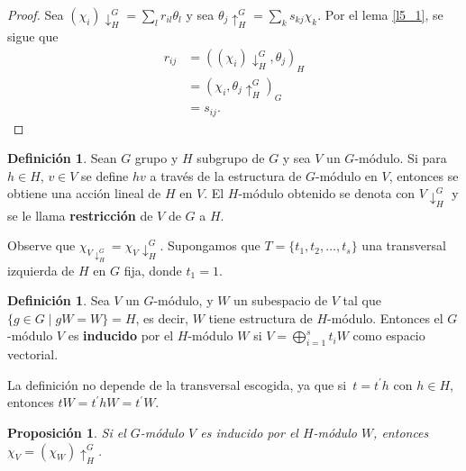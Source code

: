 \documentclass[12pt]{book}
\newtheorem{proposition}[theorem]{Proposición}
\theoremstyle{definition}
\newtheorem{definition}[theorem]{Definición}
\newcounter{in}
\newcounter{ini}
\begin{document}
\begin{proof}
  Sea $(\chi_{i})\downarrow^{G}_{H} = \sum_{l} r_{il} \theta_{l}$ y sea
  $\theta_{j}\uparrow^{G}_{H} = \sum_{k} s_{kj} \chi_{k}$. Por el lema \ref{l5_1}, se
  sigue que
  \begin{equation}
    \label{eq:66}
    \begin{aligned}
      r_{ij} &= ((\chi_{i})\downarrow^{G}_{H},\theta_{j})_{H} \\
      &= (\chi_{i},\theta_{j}\uparrow^{G}_{H})_{G}\\
      &= s_{ij}.
    \end{aligned}
  \end{equation}
\end{proof}
\begin{mdframed}
\begin{definition}
  Sean $G$ grupo y $H$ subgrupo de $G$ y sea $V$ un $G$-módulo. 
  Si para $h\in H$, $v\in V$ se define $hv$ a través de la estructura de
  $G$-módulo en $V$, entonces se obtiene una acción lineal de $H$ en $V$. El
  $H$-módulo obtenido se denota con $V\downarrow^{G}_{H}$ y se le
  llama \textbf{restricción} de $V$ de $G$ a $H$.
\end{definition}
Observe que
$\chi_{V\downarrow^{G}_{H}}=\chi_{V}\!\downarrow^{G}_{H}$. Supongamos
que $T=\{t_{1},t_{2},\ldots,t_{s}\}$ una transversal izquierda de $H$
en $G$ fija, donde $t_{1}=1$.
\begin{definition}
\label{mod_ind}
  Sea $V$ un $G$-módulo, y $W$ un subespacio de $V$ tal que $\{g\in
  G\mid gW=W\}=H$, es decir, $W$ tiene estructura de $H$-módulo. Entonces el
  $G$-módulo $V$ es \textbf{inducido} por el $H$-módulo $W$ si
  $V=\bigoplus^{s}_{i=1}t_{i}W$ como espacio vectorial.
\end{definition}
La definición no depende de la transversal escogida, ya que
si~$t=t^{'}h$ con $h\in H$, entonces $tW=t^{'}hW=t^{'}W$.
\begin{proposition}
  \label{car-ind-W-V}
  Si el $G$-módulo $V$ es inducido por el $H$-módulo $W$, entonces
  $\chi_{V}=(\chi_{W})\uparrow^{G}_{H}$.
\end{proposition}
\end{mdframed}
\end{document}
